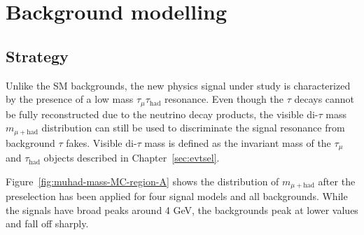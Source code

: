 \chapter{Background modelling\label{sec:bkg}}

\section{Strategy\label{sec:bkg-strategy}}
Unlike the SM backgrounds, the new physics signal under study is characterized by the presence of a low mass $\tau_\mu\tau_\text{had}$ resonance.  Even though the $\tau$ decays cannot be fully reconstructed due to the neutrino decay products, the visible di-$\tau$ mass $m_{\mu+\text{had}}$ distribution can still be used to discriminate the signal resonance from background $\tau$ fakes.  Visible di-$\tau$ mass is defined as the invariant mass of the $\tau_\mu$ and $\tau_\text{had}$ objects described in Chapter~\ref{sec:evtsel}.

Figure~\ref{fig:muhad-mass-MC-region-A} shows the distribution of $m_{\mu+\text{had}}$ after the preselection has been applied for four signal models and all backgrounds.  While the signals have broad peaks around 4 GeV, the backgrounds peak at lower values and fall off sharply.


